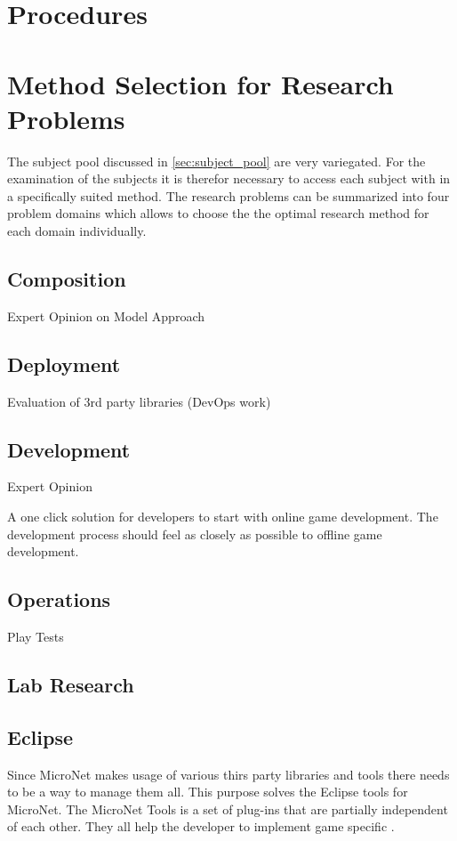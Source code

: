\section{Procedures}

\section{Method Selection for Research Problems}

The subject pool discussed in \autoref{sec:subject_pool} are very variegated.
For the examination of the subjects it is therefor necessary to access each
subject with in a specifically suited method. The research problems can be
summarized into four problem domains which allows to choose the the optimal
research method for each domain individually.

\subsection{Composition}
Expert Opinion on Model Approach

\subsection{Deployment}
Evaluation of 3rd party libraries (DevOps work)


\subsection{Development}
Expert Opinion

A one click solution for developers to start with online game
  	  development. The development process should feel as closely as possible to
  	  offline game development.

\subsection{Operations}
Play Tests

\subsection{Lab Research}

\subsection{Eclipse}

Since MicroNet makes usage of various thirs party libraries and tools there
needs to be a way to manage them all. This purpose solves the Eclipse tools for
MicroNet. The MicroNet Tools is a set of plug-ins that are partially independent
of each other. They all help the developer to implement game specific \mss{}.

